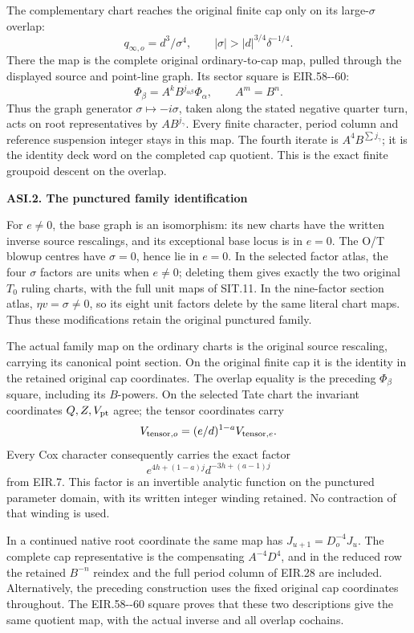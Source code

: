 The complementary chart reaches the original finite cap only on
its large-\(\sigma\) overlap:
\[
 q_{\infty,o}=d^3/\sigma^4,\qquad
 |\sigma|>|d|^{3/4}\delta^{-1/4}.
\]
There the map is the complete original ordinary-to-cap map, pulled
through the displayed source and point-line graph. Its sector
square is EIR.58-\/-60:
\[
 \Phi_\beta=A^kB^{j_{\alpha\beta}}\Phi_\alpha,\qquad A^m=B^n.
\]
Thus the graph generator \(\sigma\mapsto-i\sigma\), taken along
the stated negative quarter turn, acts on root representatives
by \(AB^{j_\gamma}\). Every finite character, period column and
reference suspension integer stays in this map. The fourth
iterate is \(A^4B^{\sum j_\gamma}\); it is the identity deck
word on the completed cap quotient. This is the exact finite
groupoid descent on the overlap.

\par

\medskip\noindent\textbf{ASI.2. The punctured family identification}

\par\nobreak

For \(e\ne0\), the base graph is an isomorphism: its new charts
have the written inverse source rescalings, and its exceptional
base locus is in \(e=0\). The O/T blowup centres have
\(\sigma=0\), hence lie in \(e=0\). In the selected factor
atlas, the four \(\sigma\) factors are units when \(e\ne0\);
deleting them gives exactly the two original \(T_0\) ruling
charts, with the full unit maps of SIT.11. In the nine-factor
section atlas, \(\eta v=\sigma\ne0\), so its eight unit factors
delete by the same literal chart maps. Thus these modifications
retain the original punctured family.

The actual family map on the ordinary charts is the original
source rescaling, carrying its canonical point section. On the
original finite cap it is the identity in the retained original
cap coordinates. The overlap equality is the preceding
\(\Phi_\beta\) square, including its \(B\)-powers. On the selected
Tate chart the invariant coordinates \(Q,Z,V_{\rm pt}\) agree;
the tensor coordinates carry
\[
 V_{{\rm tensor},o}=(e/d)^{1-a}V_{{\rm tensor},e}.
\]
Every Cox character consequently carries the exact factor
\[
 e^{4h+(1-a)j}d^{-3h+(a-1)j}
\]
from EIR.7. This factor is an invertible analytic function on
the punctured parameter domain, with its written integer
winding retained. No contraction of that winding is used.

In a continued native root coordinate the same map has
\(J_{u+1}=D_o^{-4}J_u\). The complete cap representative is
the compensating \(A^{-4}D^4\), and in the reduced row the
retained \(B^{-n}\) reindex and the full period column of
EIR.28 are included. Alternatively, the preceding construction
uses the fixed original cap coordinates throughout. The
EIR.58-\/-60 square proves that these two descriptions give the
same quotient map, with the actual inverse and all overlap
cochains.

